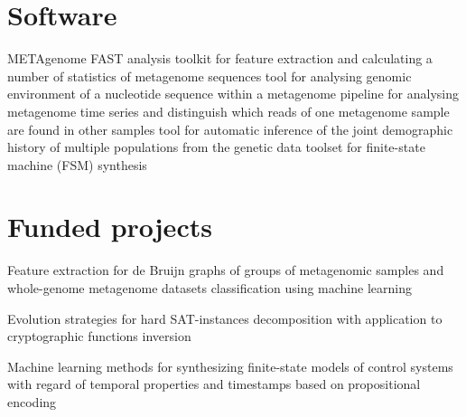 \documentclass[11pt,a4paper,sans]{moderncv}        %
\begin{document}
\section{Software}

        {}{METAgenome FAST analysis toolkit for feature extraction and calculating a number of statistics of metagenome sequences}
        {}{tool for analysing genomic environment of a nucleotide sequence within a metagenome}
        {}{pipeline for analysing metagenome time series and distinguish which reads of one metagenome sample are found in other samples}
        {}{tool for automatic inference of the joint demographic history of multiple populations from the genetic data}
        {}{toolset for finite-state machine (FSM) synthesis}

\section{Funded projects}


        {}{Feature extraction for de Bruijn graphs of groups of metagenomic samples 
           and whole-genome metagenome datasets classification using machine learning}

        {}{Evolution strategies for hard SAT-instances decomposition 
           with application to cryptographic functions inversion}

        {}{Machine learning methods for synthesizing finite-state models of control systems 
           with regard of temporal properties and timestamps based on propositional encoding}
\end{document}
